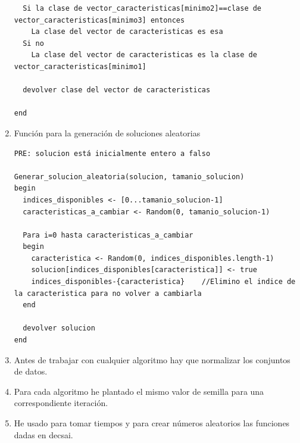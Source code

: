 \begin{enumerate}
\begin{lstlisting}
  Si la clase de vector_caracteristicas[minimo2]==clase de vector_caracteristicas[minimo3] entonces
    La clase del vector de caracteristicas es esa
  Si no
    La clase del vector de caracteristicas es la clase de vector_caracteristicas[minimo1]
    
  devolver clase del vector de caracteristicas
  
end
		\end{lstlisting}
		
		\item Función para la generación de soluciones aleatorias
\begin{lstlisting}
PRE: solucion está inicialmente entero a falso

Generar_solucion_aleatoria(solucion, tamanio_solucion)
begin
  indices_disponibles <- [0...tamanio_solucion-1]
  caracteristicas_a_cambiar <- Random(0, tamanio_solucion-1)
  
  Para i=0 hasta caracteristicas_a_cambiar
  begin
    caracteristica <- Random(0, indices_disponibles.length-1)
    solucion[indices_disponibles[caracteristica]] <- true
    indices_disponibles-{caracteristica}    //Elimino el indice de la caracteristica para no volver a cambiarla
  end
  
  devolver solucion
end

\end{lstlisting}
		
		\item Antes de trabajar con cualquier algoritmo hay que normalizar los conjuntos de datos.
		
		\item Para cada algoritmo he plantado el mismo valor de semilla para una correspondiente iteración.
		
		\item He usado para tomar tiempos y para crear números aleatorios las funciones dadas en decsai.
	\end{enumerate}
	
